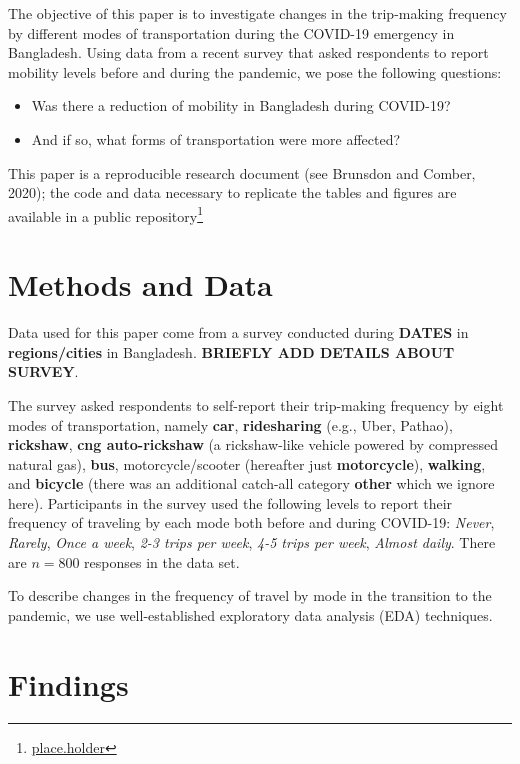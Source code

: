 \documentclass[]{elsarticle} %
\providecommand{\tightlist}{%
  \setlength{\itemsep}{0pt}\setlength{\parskip}{0pt}}
\begin{document}
The objective of this paper is to investigate changes in the trip-making
frequency by different modes of transportation during the COVID-19
emergency in Bangladesh. Using data from a recent survey that asked
respondents to report mobility levels before and during the pandemic, we
pose the following questions:

\begin{itemize}
\tightlist
\item
  Was there a reduction of mobility in Bangladesh during COVID-19?
\item
  And if so, what forms of transportation were more affected?
\end{itemize}

This paper is a reproducible research document (see Brunsdon and Comber,
2020); the code and data necessary to replicate the tables and figures
are available in a public repository\footnote{\url{place.holder}}

\hypertarget{methods-and-data}{%
\section{Methods and Data}\label{methods-and-data}}

Data used for this paper come from a survey conducted during
\textbf{DATES} in \textbf{regions/cities} in Bangladesh. \textbf{BRIEFLY
ADD DETAILS ABOUT SURVEY}.

The survey asked respondents to self-report their trip-making frequency
by eight modes of transportation, namely \textbf{car},
\textbf{ridesharing} (e.g., Uber, Pathao), \textbf{rickshaw},
\textbf{cng auto-rickshaw} (a rickshaw-like vehicle powered by
compressed natural gas), \textbf{bus}, motorcycle/scooter (hereafter
just \textbf{motorcycle}), \textbf{walking}, and \textbf{bicycle} (there
was an additional catch-all category \textbf{other} which we ignore
here). Participants in the survey used the following levels to report
their frequency of traveling by each mode both before and during
COVID-19: \emph{Never}, \emph{Rarely}, \emph{Once a week}, \emph{2-3
trips per week}, \emph{4-5 trips per week}, \emph{Almost daily}. There
are \(n=800\) responses in the data set.

To describe changes in the frequency of travel by mode in the transition
to the pandemic, we use well-established exploratory data analysis (EDA)
techniques.

\hypertarget{findings}{%
\section{Findings}\label{findings}}
\end{document}
